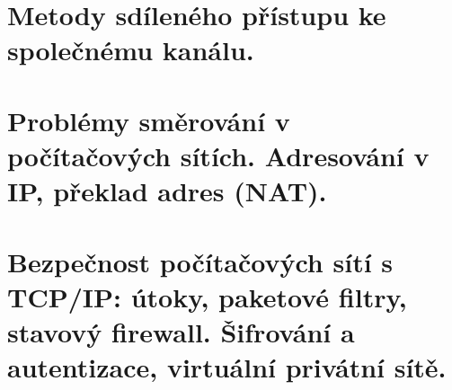 \documentclass[openany]{book}
\begin{document}
\chapter{Metody sdíleného přístupu ke společnému kanálu. }


\chapter{Problémy směrování v počítačových sítích. Adresování v IP, překlad adres (NAT). }


\chapter{Bezpečnost počítačových sítí s TCP/IP: útoky, paketové filtry, stavový firewall. Šifrování a autentizace, virtuální privátní sítě.  }

\end{document}
